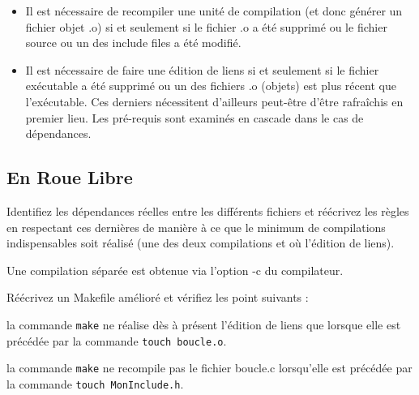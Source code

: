 \begin{itemize}
\item Il est nécessaire de recompiler une unité de compilation (et donc générer un fichier objet .o) si et seulement si le fichier .o a été supprimé ou le fichier source ou un des include files a été modifié.
\item Il est nécessaire de faire une édition de liens si et seulement si le fichier exécutable a été supprimé ou un des fichiers .o (objets) est plus récent que l'exécutable. Ces derniers nécessitent d'ailleurs peut-être d'être rafraîchis en premier lieu. Les pré-requis sont examinés en cascade dans le cas de dépendances.

\end{itemize}

\subsection{En Roue Libre}
\par Identifiez les dépendances réelles entre les différents fichiers et réécrivez les règles en respectant ces dernières de manière à ce que le minimum de compilations indispensables soit réalisé (une des deux compilations et où l'édition de liens).

\par Une compilation séparée est obtenue via l'option -c du compilateur.\\

\par Réécrivez un Makefile amélioré et vérifiez les
 point suivants :
\par la commande  \texttt{make} ne réalise dès à présent l'édition de liens que lorsque elle est précédée par la commande \texttt{touch boucle.o}.

\par la commande  \texttt{make} ne recompile pas le fichier boucle.c lorsqu'elle est précédée par la commande \texttt{touch MonInclude.h}.
\newpage
